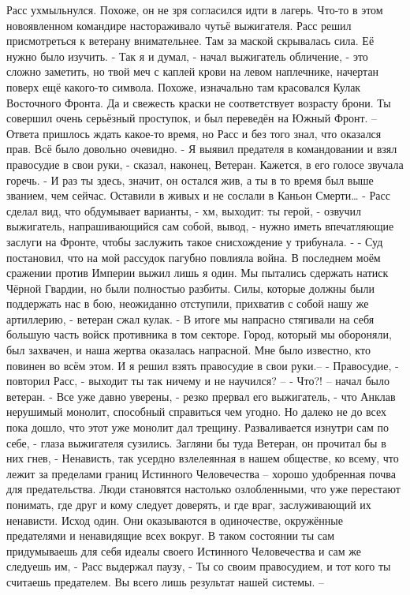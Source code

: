 \documentclass[a4paper, 12pt]{report}
\begin{document}
Расс ухмыльнулся. Похоже, он не зря согласился идти в лагерь. Что-то в этом новоявленном командире настораживало чутьё выжигателя. Расс решил присмотреться к ветерану внимательнее. Там за маской скрывалась сила. Её нужно было изучить.
- Так я и думал, - начал выжигатель обличение, - это сложно заметить, но твой меч с каплей крови на левом наплечнике, начертан поверх ещё какого-то символа. Похоже, изначально там красовался Кулак Восточного Фронта. Да и свежесть краски не соответствует возрасту брони. Ты совершил очень серьёзный проступок, и был переведён на Южный Фронт. –
Ответа пришлось ждать какое-то время, но Расс и без того знал, что оказался прав. Всё было довольно очевидно.
- Я выявил предателя в командовании и взял правосудие в свои руки, - сказал, наконец, Ветеран. Кажется, в его голосе звучала горечь.
- И раз ты здесь, значит, он остался жив, а ты в то время был выше званием, чем сейчас. Оставили в живых и не сослали в Каньон Смерти… - Расс сделал вид, что обдумывает варианты, - хм, выходит: ты герой, - озвучил выжигатель, напрашивающийся сам собой, вывод, - нужно иметь впечатляющие заслуги на Фронте, чтобы заслужить такое снисхождение у трибунала. -
- Суд постановил, что на мой рассудок пагубно повлияла война. В последнем моём сражении против Империи выжил лишь я один. Мы пытались сдержать натиск Чёрной Гвардии, но были полностью разбиты. Силы, которые должны были поддержать нас в бою, неожиданно отступили, прихватив с собой нашу же артиллерию, - ветеран сжал кулак. - В итоге мы напрасно стягивали на себя большую часть войск противника в том секторе. Город, который мы обороняли, был захвачен, и наша жертва оказалась напрасной. Мне было известно, кто повинен во всём этом. И я решил взять правосудие в свои руки.–
- Правосудие, - повторил Расс, - выходит ты так ничему и не научился? –
- Что?! – начал было ветеран.
- Все уже давно уверены, - резко прервал его выжигатель, - что Анклав нерушимый монолит, способный справиться чем угодно. Но далеко не до всех пока дошло, что этот уже монолит дал трещину. Разваливается изнутри сам по себе, - глаза выжигателя сузились. Загляни бы туда Ветеран, он прочитал бы в них гнев, - Ненависть, так усердно взлелеянная в нашем обществе, ко всему, что лежит за пределами границ Истинного Человечества – хорошо удобренная почва для предательства. Люди становятся настолько озлобленными, что уже перестают понимать, где друг и кому следует доверять, и где враг, заслуживающий их ненависти. Исход один. Они оказываются в одиночестве, окружённые предателями и ненавидящие всех вокруг. В таком состоянии ты сам придумываешь для себя идеалы своего Истинного Человечества и сам же следуешь им, - Расс выдержал паузу, - Ты со своим правосудием, и тот кого ты считаешь предателем. Вы всего лишь результат нашей системы. –
\end{document}
